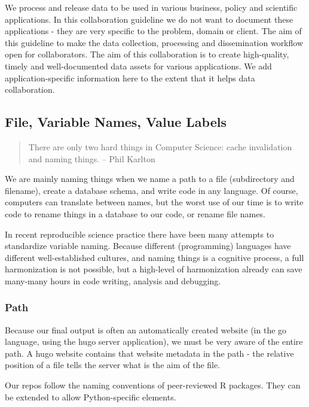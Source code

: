 \documentclass[
  fontsize=13pt,
  english,
  a4paper,
  openany, a4paper, oneside]{article}
\begin{document}
We process and release data to be used in various business, policy and scientific applications. In this collaboration guideline we do not want to document these applications - they are very specific to the problem, domain or client. The aim of this guideline to make the data collection, processing and dissemination workflow open for collaborators. The aim of this collaboration is to create high-quality, timely and well-documented data assets for various applications. We add application-specific information here to the extent that it helps data collaboration.

\hypertarget{naming-conventions}{%
\subsection{File, Variable Names, Value Labels}\label{naming-conventions}}

\begin{quote}
There are only two hard things in Computer Science: cache invalidation and naming things. -- Phil Karlton
\end{quote}

We are mainly naming things when we name a path to a file (subdirectory and filename), create a database schema, and write code in any language. Of course, computers can translate between names, but the worst use of our time is to write code to rename things in a database to our code, or rename file names.

In recent reproducible science practice there have been many attempts to standardize variable naming. Because different (programming) languages have different well-established cultures, and naming things is a cognitive process, a full harmonization is not possible, but a high-level of harmonization already can save many-many hours in code writing, analysis and debugging.

\hypertarget{path}{%
\subsubsection{Path}\label{path}}

Because our final output is often an automatically created website (in the go language, using the hugo server application), we must be very aware of the entire path. A hugo website contains that website metadata in the path - the relative position of a file tells the server what is the aim of the file.

Our repos follow the naming conventions of peer-reviewed R packages. They can be extended to allow Python-specific elements.
\end{document}
